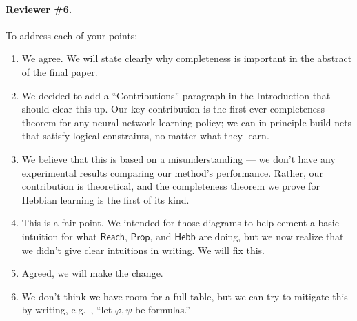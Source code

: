 \documentclass[letterpaper]{article}
\theoremstyle{definition}
\newcommand{\Prop}{\textsf{Prop}}
\newcommand{\Reach}{\textsf{Reach}}
\newcommand{\HebbNoArgs}{\textsf{Hebb}}
\begin{document}
\paragraph{Reviewer \#6.}
To address each of your points:
\begin{enumerate}
    \item We agree.  We will state clearly why completeness is important in the abstract of the final paper.

    \item We decided to add a ``Contributions'' paragraph in the Introduction that should clear this up.  Our key contribution is the first ever completeness theorem for any neural network learning policy; we can in principle build nets that satisfy logical constraints, no matter what they learn.
    
    

    \item We believe that this is based on a misunderstanding --- we don't have any experimental results comparing our method's performance.  Rather, our contribution is theoretical, and the completeness theorem we prove for Hebbian learning is the first of its kind.

    \item This is a fair point.  We intended for those diagrams to help cement a basic intuition for what $\Reach$, $\Prop$, and $\HebbNoArgs$ are doing, but we now realize that we didn’t give clear intuitions in writing.  We will fix this.

    \item Agreed, we will make the change.

    \item We don't think we have room for a full table, but we can try to mitigate this by writing, e.g.~, ``let $\varphi, \psi$ be formulas.''
\end{enumerate}
\end{document}
